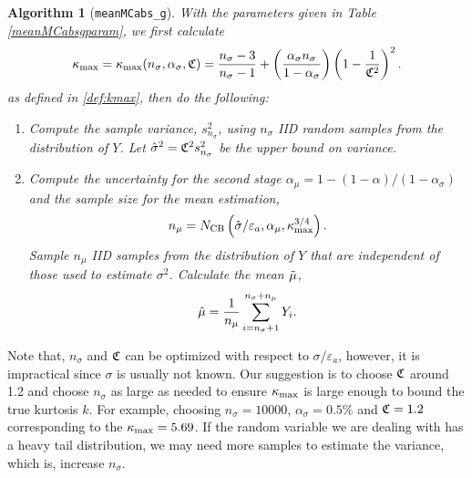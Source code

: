 \documentclass{iitthesis}
\newtheorem{algorithm}[theorem]{Algorithm}
\theoremstyle{definition}
\begin{document}
\begin{algorithm}[{\tt meanMCabs\_g}]
With the parameters given in Table \ref{meanMCabsgparam}, we first calculate 
\begin{equation}	\label{kmaxinalg}
\kappa_{\max}=\kappa_{\max}(n_\sigma,\alpha_\sigma,\mathfrak{C}) =\frac{n_\sigma-3}{n_\sigma-1} + \left(\frac{ \alpha_\sigma n_\sigma}{1-\alpha_\sigma}\right) \left(1 - \frac{1}{\mathfrak{C}^2}\right)^2.
\end{equation}
as defined in \eqref{def:kmax}, then do the following:
\begin{enumerate}
\item Compute the sample variance, $s^2_{n_{\sigma}}$, using $n_\sigma$ IID random samples from the distribution of  $Y$. Let $\hat{\sigma}^2 = \mathfrak{C}^2 s^2_{n_\sigma}$ be the upper bound on variance.
\item Compute the uncertainty for the second stage $\alpha_\mu = 1-(1-\alpha)/(1-\alpha_{\sigma})$ and the sample size for the mean estimation,
\begin{align}\label{def:meanmcabsgnmu}
n_\mu = N_{\text{CB}} \left(\hat{\sigma}/\varepsilon_a,\alpha_\mu, \kappa_{\max}^{3/4}\right).
\end{align}
Sample $n_\mu$ IID samples from the distribution of $Y$ that are independent of those used to estimate $\sigma^2$. Calculate the mean $\tilde{\mu}$,
\begin{align}\label{def:meanmcabsghmu}
\hat{\mu} = \frac{1}{n_\mu}\sum_{i = n_\sigma+1}^{n_\sigma+n_\mu}Y_i.
\end{align}
\end{enumerate}
\end{algorithm}
 Note that, $n_\sigma$ and $\mathfrak{C}$ can be optimized with respect to $\sigma/\varepsilon_a$, however, it is impractical since $\sigma$ is usually not known. Our suggestion is to choose $\mathfrak{C}$ around 1.2 and choose $n_\sigma$ as large as needed to ensure $\kappa_{\max}$ is large enough to bound the true kurtosis $k$. For example, choosing $n_\sigma = 10000$, $\alpha_\sigma = 0.5\%$ and $\mathfrak{C}=1.2$ corresponding to the $\kappa_{\max} = 5.69$. If the random variable we are dealing with has a heavy tail distribution, we may need more samples to estimate the variance, which is, increase $n_\sigma$. 
 
\end{document}
